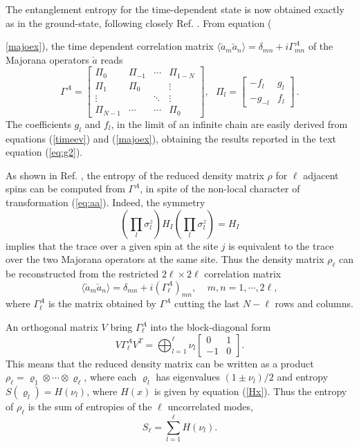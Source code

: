 \documentclass[12pt,preprint,tighten,eqsecnum,aps,floats,psfig,epsfig,amsmath,onecolumn]{revtex4-1}
\def\be{\begin{equation}}
\def\ee{\end{equation}}
\def\Ma{\check{a}}
\newcommand{\ev}[1]{\mbox{$\langle #1 \rangle$}}
\begin{document}
The entanglement entropy for the time-dependent state is now obtained 
exactly as in the ground-state, following closely Ref. \cite{Vidal}.
From equation ({\ref{majoex}), the time dependent 
correlation matrix $\ev{\Ma_m\Ma_n} = \delta_{mn} + i \Gamma^A_{mn}$ 
of the Majorana operators $\Ma$ reads
\be
\Gamma^A = \left[
 \begin{array}{ccccc}
\Pi_0  & \Pi_{-1}   &   \cdots & \Pi_{1-N}  \\
\Pi_1 & \Pi_0   & &\vdots\\

\vdots&  & \ddots&\vdots  \\
\Pi_{N-1}& \cdots  & \cdots  & \Pi_0 
\end{array}
\right], ~~~ \Pi_l = \left[\begin{array}{cc}
-f_l & g_l \\
-g_{-l} &  f_l
\end{array}
\right]\,.
\label{eq:GammaA}
\ee
The coefficients $g_l$ and $f_l$, in the limit of an infinite 
chain are easily derived from equations 
(\ref{timeev}) and (\ref{majoex}), obtaining the results reported in the text
equation (\ref{eq:g2}).


As shown in Ref. \cite{Vidal},
the entropy of the reduced density matrix $\rho$ for $\ell$ adjacent spins
can be computed from $\Gamma^A$, in spite of the non-local character of 
transformation (\ref{eq:aa}).
Indeed, the symmetry  
\be
\left(\prod_l \sigma_l^z \right) H_I \left(\prod_l \sigma_l^z \right) = H_I
\ee
implies that the trace over a given spin at the site $j$ is equivalent to 
the trace over the two Majorana operators at the same site.  
Thus the density matrix $\rho_\ell$ can be reconstructed from the restricted 
$2\ell\times 2\ell$ correlation matrix
\be
\ev{\Ma_m\Ma_n} = \delta_{mn} + i(\Gamma^A_\ell)_{mn},~~~~~m,n =1,\cdots,2\ell,
\ee
where $\Gamma^A_\ell$ is the matrix obtained by $\Gamma^A$ cutting the 
last $N-\ell$ rows and columns.

An orthogonal matrix $V$ bring $\Gamma^A_\ell$ into the block-diagonal form
\be
V\Gamma^A_\ell V^T = \bigoplus_{l=1}^\ell \nu_l
\left[ \begin{array}{cc} 0 &1  \\
-1 &0 \end{array}
\right].
\label{eq:GammaC}
\ee
This means that the reduced density matrix can be written as a product
$\rho_\ell=\varrho_1 \otimes \cdots \otimes \varrho_\ell$,
where each $\varrho_l$ has eigenvalues $(1\pm\nu_l)/2$ and entropy
$S(\varrho_l)= H(\nu_l)$, where $H(x)$ is given by equation (\ref{Hx}).
Thus the entropy of $\rho_\ell$ is the sum of entropies of the $\ell$ 
uncorrelated modes,
\be
S_\ell = \sum_{l=1}^\ell H(\nu_l).
\label{eq:entronu}
\ee

}
\end{document}
